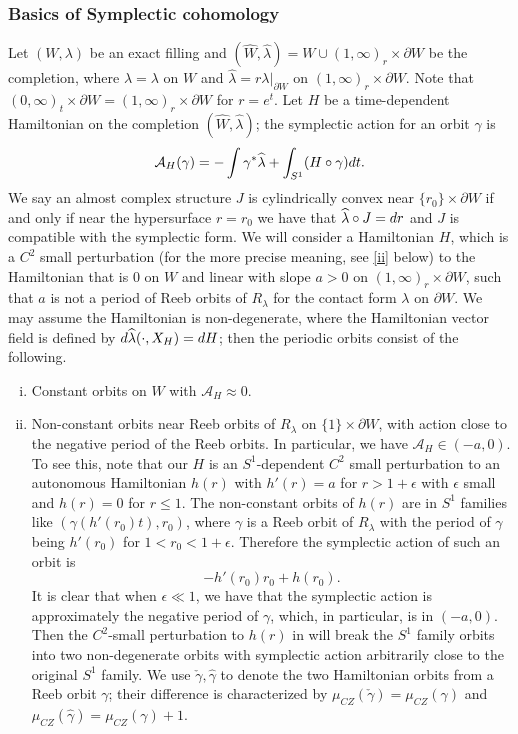 \documentclass[reqno,11pt]{amsart}
\numberwithin{equation}{section}
\def\cA{{\mathcal A}}
\def\rd{{\rm d}}
\begin{document}
\subsubsection{Basics of Symplectic cohomology}
Let $(W,\lambda)$ be an exact filling and $(\widehat{W},\widehat{\lambda})=W\cup (1,\infty)_r\times \partial W$ be the completion, where $\widehat{\lambda}=\lambda$ on $W$ and $\widehat{\lambda}=r\lambda|_{\partial W}$ on $(1,\infty)_r\times \partial W$. Note that $(0,\infty)_t\times \partial W = (1,\infty)_r\times \partial W$ for $r=e^t$. Let $H$ be a time-dependent Hamiltonian on the completion $(\widehat{W},\widehat{\lambda})$; the symplectic action for an orbit $\gamma$ is 
\begin{equation}\label{eqn:action}
\cA_H(\gamma)=-\int \gamma^*\widehat{\lambda}+\int_{S^1} (H\circ \gamma)\rd t.
\end{equation}
We say an almost complex structure $J$ is cylindrically convex near $\{r_0\} \times \partial W $ if and only if near the hypersurface $r=r_0$ we have that $\widehat{\lambda}\circ J =\rd r$ and $J$ is compatible with the symplectic form. We will consider a Hamiltonian $H$, which is a $C^2$ small perturbation (for the more precise meaning, see \eqref{ii} below) to the Hamiltonian that is $0$ on $W$ and linear with slope $a>0$ on $(1,\infty)_r\times \partial W$, such that $a$ is not a period of Reeb orbits of $R_{\lambda}$ for the contact form $\lambda$ on $\partial W$. We may assume the Hamiltonian is non-degenerate, where the Hamiltonian vector field is defined by $\rd \widehat{\lambda}(\cdot, X_{H})=\rd H$; then the periodic orbits consist of the following.
\begin{enumerate}[(i)]
	\item\label{i} Constant orbits on $W$ with $\cA_H\approx 0$.
	\item\label{ii} Non-constant orbits near Reeb orbits of $R_{\lambda}$ on $\{1\} \times \partial W$, with action close to the negative period of the Reeb orbits. In particular, we have $\cA_H\in (-a,0)$.  To see this, note that our $H$ is an $S^1$-dependent $C^2$ small perturbation to an autonomous Hamiltonian $h(r)$ with $h'(r)=a$ for $r>1+\epsilon$ with $\epsilon$ small and $h(r)=0$ for $r\le 1$. The non-constant orbits of $h(r)$ are in $S^1$ families like $(\gamma(h'(r_0)t),r_0)$, where $\gamma$ is a Reeb orbit of $R_{\lambda}$ with the period of $\gamma$ being $h'(r_0)$ for $1<r_0<1+\epsilon$. Therefore the symplectic action of such an orbit is
	$$-h'(r_0)r_0+h(r_0).$$
	It is clear that when $\epsilon\ll 1$, we have that the symplectic action is approximately the negative period of $\gamma$, which, in particular, is in $(-a,0)$. Then the $C^2$-small perturbation to $h(r)$ in \cite[Lemma 3.3]{MR2475400} will break the $S^1$ family orbits into two non-degenerate orbits with symplectic action arbitrarily close to the original $S^1$ family. We use $\check{\gamma},\hat{\gamma}$ to denote the two Hamiltonian orbits from a Reeb orbit $\gamma$; their difference is characterized by $\mu_{CZ}(\check{\gamma})=\mu_{CZ}(\gamma)$ and $\mu_{CZ}(\hat{\gamma})=\mu_{CZ}(\gamma)+1$. 
\end{enumerate} 
\end{document}
